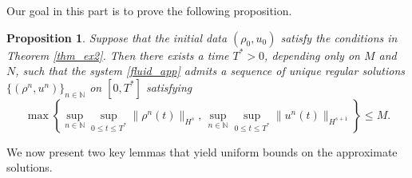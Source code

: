 \documentclass[10pt, reqno]{amsart}
\newtheorem{proposition}[theorem]{Proposition}
\theoremstyle{definition}
\theoremstyle{remark}
\numberwithin{equation}{section}
\newcommand{\N}{\mathbb{N}}
\begin{document}
Our goal in this part is to prove the following proposition.

\begin{proposition}\label{prop_app}
Suppose that the initial data $(\rho_0, u_0)$ satisfy the conditions in Theorem \ref{thm_ex2}. Then there exists a time $T^*>0$, depending only on $M$ and $N$, such that the system \eqref{fluid_app} admits a sequence of unique regular solutions $\{ (\rho^n, u^n)\}_{n\in\N}$ on $[0,T^*]$ satisfying
\begin{equation}\label{uni_app0}
\max\left\{\sup_{n\in\N} \sup_{0\le t\le T^*}   \|\rho^n(t)\|_{H^s}, \, \sup_{n\in\N} \sup_{0\le t\le T^*}\|u^n(t)\|_{H^{s+1}}  \right\} \le M.
\end{equation}
\end{proposition}

We now present two key lemmas that yield uniform bounds on the approximate solutions.
\end{document}
